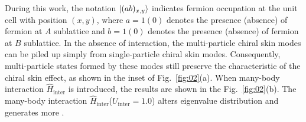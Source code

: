 \documentclass[longbibliography, aps, prx, amsmath, amssymb, amsfonts, twocolumn,superscriptaddress, footinbib]{revtex4-1}
\begin{document}
	During this work, the notation $\ket{(ab)_{x,y}}$ {} indicates fermion occupation at the unit cell with position $(x,y)$, where $a=1(0)$ denotes the presence (absence) of fermion at $A$ sublattice and $b=1(0)$ denotes the presence (absence) of fermion at $B$ sublattice.
	In the absence of interaction, the multi-particle chiral skin modes can be piled up simply from single-particle chiral skin modes. Consequently, multi-particle states formed by these modes still preserve the characteristic of the chiral skin effect, as shown in the inset of Fig.~\ref{fig:02}(a).
	When many-body interaction $\hat{H}_{\text{inter}}$ is introduced, the results are shown in the Fig.~\ref{fig:02}(b). The many-body interaction $\hat{H}_{\text{inter}}$($U_{\text{inter}}=1.0$) alters eigenvalue distribution and generates more {\color{blue}{localized eigenstate distribution}}. 


\end{document}
